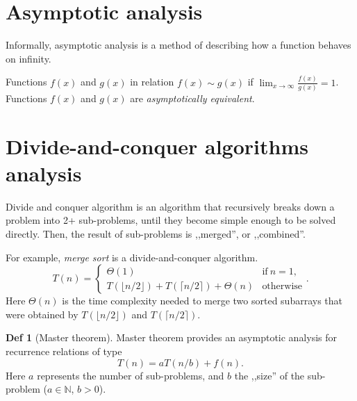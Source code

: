 \documentclass[a4paper]{article}
\theoremstyle{definition}
\newtheorem{definition}{Def}
\begin{document}
\section{Asymptotic analysis}

Informally, asymptotic analysis is a method of describing how
a function behaves on infinity.

Functions \(f(x)\) and \(g(x)\) in relation \(f(x) \sim g(x)\)
if  \(\lim_{x \to \infty} \frac{f(x)}{g(x)} = 1\).
Functions \(f(x)\) and \(g(x)\) are \textit{asymptotically equivalent}.

\section{Divide-and-conquer algorithms analysis}

Divide and conquer algorithm is an algorithm
that recursively breaks down a problem into
2+ sub-problems, until they become simple enough
to be solved directly. Then,
the result of sub-problems is ,,merged'',
or ,,combined''.

For example, \textit{merge sort}
is a divide-and-conquer algorithm.
\[
  T(n) =
\begin{cases}
  \Theta(1) & \text{if}\ n = 1, \\
  T(\lfloor n/2 \rfloor) + T(\lceil n/2 \rceil) + \Theta(n) & \text{otherwise}
\end{cases}
.\]
Here \(\Theta(n)\) is the time complexity needed to merge two sorted subarrays
that were obtained by \(T(\lfloor n/2 \rfloor)\) and \(T(\lceil n/2 \rceil)\).

\begin{definition}[Master theorem]
  Master theorem provides an asymptotic analysis
  for recurrence relations of type
  \[
  T(n) = a T(n / b) + f(n)
  .\]
  Here \(a\) represents the number of sub-problems,
  and  \(b\) the ,,size'' of the sub-problem
  (\(a \in \mathbb{N}\), \(b > 0\)).
\end{definition}

\newcommand\ccrit{{c_\text{crit}}}
\end{document}
